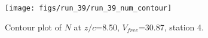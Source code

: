 \begin{figure}[H]
\centering
\texttt{[image: figs/run\_39/run\_39\_num\_contour]}
\caption{Contour plot of $N$ at $z/c$=8.50, $V_{free}$=30.87, station 4.}
\label{fig:run_39_num_contour}
\end{figure}


